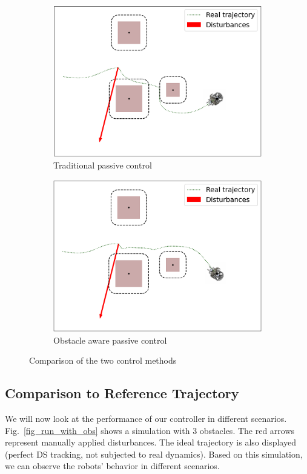 \documentclass[conference]{IEEEtran}
\begin{document}
\begin{figure}
\centering
\begin{subfigure}{0.5\columnwidth}
  \centerline{\includegraphics[width=\textwidth]{figures/run_without_pass.png}}
  \caption{Traditional passive control}
\end{subfigure}%
\begin{subfigure}{0.5\columnwidth}
  \centerline{\includegraphics[width=\textwidth]{figures/run_with_pass.png}}
  \caption{Obstacle aware passive control}
\end{subfigure}
\caption{Comparison of the two control methods}
\label{fig:diff_obs_pass}
\end{figure}

\subsection{Comparison to Reference Trajectory}
We will now look at the performance of our controller in different scenarios. Fig.~\ref{fig_run_with_obs} shows a simulation with 3 obstacles. The red arrows represent manually applied disturbances. The ideal trajectory is also displayed (perfect DS tracking, not subjected to real dynamics). Based on this simulation, we can observe the robots' behavior in different scenarios.
\end{document}
